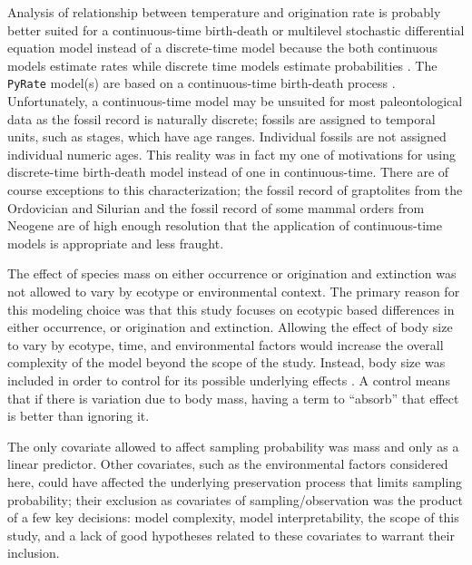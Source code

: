 \documentclass[12pt,letterpaper]{article}
\begin{document}
Analysis of relationship between temperature and origination rate is probably better suited for a continuous-time birth-death or multilevel stochastic differential equation model instead of a discrete-time model because the both continuous models estimate rates while discrete time models estimate probabilities \citep{Allen2011}. The \texttt{PyRate} model(s) are based on a continuous-time birth-death process \citep{Silvestro2014a,Silvestro2015b}. Unfortunately, a continuous-time model may be unsuited for most paleontological data as the fossil record is naturally discrete; fossils are assigned to temporal units, such as stages, which have age ranges. Individual fossils are not assigned individual numeric ages. This reality was in fact my one of motivations for using discrete-time birth-death model instead of one in continuous-time. There are of course exceptions to this characterization; the fossil record of graptolites from the Ordovician and Silurian \citep{Crampton2016a} and the fossil record of some mammal orders from Neogene are of high enough resolution that the application of continuous-time models is appropriate and less fraught.

The effect of species mass on either occurrence or origination and extinction was not allowed to vary by ecotype or environmental context. The primary reason for this modeling choice was that this study focuses on ecotypic based differences in either occurrence, or origination and extinction. Allowing the effect of body size to vary by ecotype, time, and environmental factors would increase the overall complexity of the model beyond the scope of the study. Instead, body size was included in order to control for its possible underlying effects \citep{McElreath2016}. A control means that if there is variation due to body mass, having a term to ``absorb'' that effect is better than ignoring it. %

The only covariate allowed to affect sampling probability was mass and only as a linear predictor. Other covariates, such as the environmental factors considered here, could have affected the underlying preservation process that limits sampling probability; their exclusion as covariates of sampling/observation was the product of a few key decisions: model complexity, model interpretability, the scope of this study, and a lack of good hypotheses related to these covariates to warrant their inclusion. %
\end{document}
